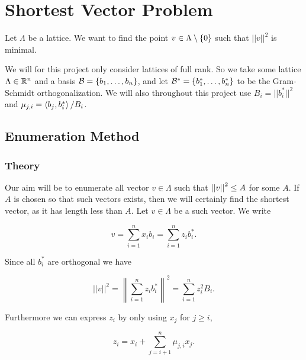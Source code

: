 \section{Shortest Vector Problem}

  \begin{problem}
    \label{pb:svp}
    Let $\Lambda$ be a lattice. We want to find the point $v \in \Lambda \setminus \left\lbrace  0  \right\rbrace $ such that $||v||^2$ is minimal.
  \end{problem}

  We will for this project only consider lattices of full rank.
  So we take some lattice $\Lambda \in \mathbb{R}^n$ and a basis $\mathcal{B} = \left\lbrace  b_1, \dots, b_n  \right\rbrace$, and let $\mathcal{B}^* = \left\lbrace  b_1^*, \dots, b_n^*  \right\rbrace$ to be the Gram-Schmidt orthogonalization.
  We will also throughout this project use $B_i = ||b_i^*||^2$ and $\mu_{j,i} = \left< b_j, b_i^* \right>/B_i$.

\subsection{Enumeration Method} \label{sec:svp-enum}

\subsubsection{Theory}


  Our aim will be to enumerate all vector $v \in \Lambda$ such that $\left|\left| v \right|\right|^2 \leq A$ for some $A$.
  If $A$ is chosen so that such vectors exists, then we will certainly find the shortest vector, as it has length less than $A$.
  Let $v\in \Lambda$ be a such vector.
  We write

  \begin{equation}
    v = \sum_{i=1}^{n} x_i b_i = \sum_{i=1}^{n} z_i b_i^*.
    \label{eq:v-representation}
  \end{equation}

  Since all $b_i^*$ are orthogonal we have

  \begin{equation}
    ||v||^2 = \left\| \sum_{i=1}^{n} z_i b_i^* \right\|^2 = \sum_{i=1}^{n} z_i^2 B_i.
    \label{eq:v-length}
  \end{equation}

  Furthermore we can express $z_i$ by only using $x_j$ for $j \geq i$, 

  \begin{equation}
    z_i = x_i + \sum_{j=i+1}^{n} \mu_{j,i} x_j.
  \end{equation}

